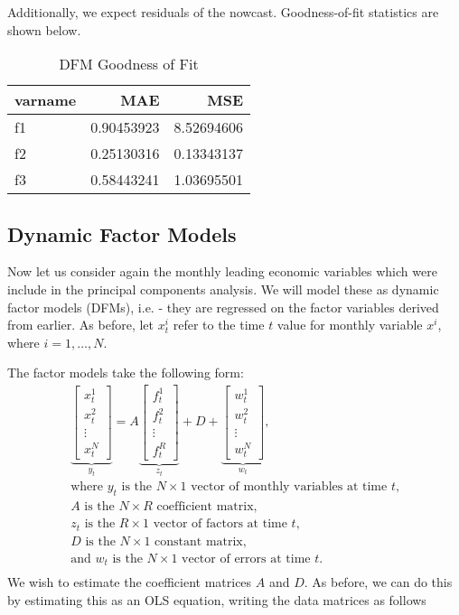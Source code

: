 \documentclass[11pt, letterpaper]{article}\usepackage[]{graphicx}\usepackage[]{color}
\begin{document}
Additionally, we expect residuals of the nowcast. Goodness-of-fit statistics are shown below.
\begin{table}[H]
\centering
\begingroup\footnotesize
\begin{tabular}{lrr}
  \hline
varname & MAE & MSE \\ 
  \hline
f1 & 0.90453923 & 8.52694606 \\ 
  f2 & 0.25130316 & 0.13343137 \\ 
  f3 & 0.58443241 & 1.03695501 \\ 
   \hline
\end{tabular}
\endgroup
\caption{DFM Goodness of Fit} 
\end{table}




\subsection{Dynamic Factor Models}
Now let us consider again the monthly leading economic variables which were include in the principal components analysis. We will model these as dynamic factor models (DFMs), i.e. - they are regressed on the factor variables derived from earlier. As before, let $x^i_t$ refer to the time $t$ value for monthly variable $x^i$, where $i = 1, \dots, N$.

The factor models take the following form:
\begin{align*}
\underbrace{\begin{bmatrix}
	x^1_t\\
	x^2_t\\
	\vdots \\
	x^N_t
\end{bmatrix}}_{y_t}
=
A
\underbrace{\begin{bmatrix}
	f^1_{t}\\
	f^2_{t}\\
	\vdots \\
	f^R_{t}
\end{bmatrix}}_{z_t}
+
D 
+
\underbrace{\begin{bmatrix}
	w^1_t\\
	w^2_t\\
	\vdots\\
	w^N_t
\end{bmatrix}}_{w_t},\\
\text{where $y_t$ is the $N \times 1$ vector of monthly variables at time $t$,}\\
\text{$A$ is the $N \times R$ coefficient matrix,}\\
\text{$z_t$ is the $R \times 1$ vector of factors at time $t$,}\\
\text{$D$ is the $N \times 1$ constant matrix,}\\
\text{and $w_t$ is the $N \times 1$ vector of errors at time $t$.}\\
\end{align*}
We wish to estimate the coefficient matrices $A$ and $D$. As before, we can do this by estimating this as an OLS equation, writing the data matrices as follows
\end{document}
